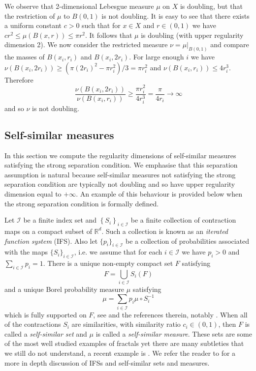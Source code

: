 We observe  that 2-dimensional Lebesgue measure $\mu$ on $X$ is doubling, but that the restriction of $\mu$ to $B(0,1)$ is not doubling.  It is easy to see that there exists a uniform constant $c>0$ such that for $x \in X$ and $r\in (0,1)$ we have $cr^2 \leq \mu(B(x,r)) \leq \pi r^2$.  It follows that $\mu$ is doubling (with upper regularity dimension 2).  We now consider the restricted measure $\nu = \mu \vert_{B(0,1)}$ and compare the masses of $B(x_i,r_i)$ and $B(x_i,2r_i)$. For large enough $i$ we have $\nu (B(x_i,2r_i)) \ge (\pi (2r_i)^2-\pi r_i^2)/3 = \pi r_i^2$  and $\nu (B(x_i,r_i)) \le 4 r_i^3$. Therefore
\[
\frac{\nu(B(x_i,2r_i))}{\nu(B(x_i,r_i))} \ge \frac{\pi r_i^2}{4r_i^3} =  \frac{\pi}{4r_i} \to \infty
\]
and so  $\nu$ is not doubling.


\subsection{Self-similar measures}\label{ch-upper-reg:sec:self-similarresult}

In this section we compute the regularity dimensions of self-similar measures satisfying the strong separation condition. We emphasise that this separation assumption is natural because self-similar measures not satisfying the strong separation condition are typically not doubling and so have upper regularity dimension equal to $+\infty$. An example of this behaviour is provided below when the strong separation condition is formally defined. 

Let  $\mathcal{I}$ be a finite index set and $\left\{S_i \right\}_{i \in \mathcal{I}}$ be a finite collection of  contraction maps on a compact subset of $\mathbb{R}^d$.  Such a collection is known as an \textit{iterated function system} (IFS).  Also let $\{p_i\}_{i \in \mathcal{I}}$ be a collection of probabilities associated with the maps $\{S_i\}_{i \in \mathcal{I}}$, i.e. we assume that for each $i \in \mathcal{I}$ we have $p_i>0$ and $\sum_{i \in \mathcal{I}} p_i = 1$. There is a  unique non-empty compact set $F$ satisfying 
\[
F=\displaystyle\bigcup_{i\in \mathcal{I}} S_i(F)
\]
and  a unique Borel probability measure $\mu$ satisfying
\[
\mu = \sum_{i \in \mathcal{I}} p_i \mu \circ S_i^{-1}
\]
which is fully supported on $F$, see \cite[Chapter 9]{falconer} and the references therein, notably \cite{hutchinson}. When all of the contractions $S_i$ are similarities, with similarity ratio $c_i \in \left(0,1 \right)$, then $F$ is called a \emph{self-similar set} and $\mu$ is called a \emph{self-similar measure}. These sets are some of the most well studied examples of fractals yet there are many subtleties that we still do not understand, a recent example is \cite{baker}. We refer the reader to \cite{falconer} for a more in depth discussion of IFSs and self-similar sets and measures.


